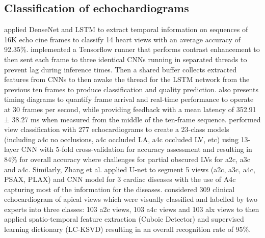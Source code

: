 \documentclass[mlabstract,twocolumn]{jmlr}
\begin{document}
\subsection{Classification of echochardiograms}
\citet{woudenberg2018} applied DenseNet and LSTM to extract temporal information on sequences of 16K echo cine frames to classify 14 heart views with an average accuracy of 92.35\%.
\citet{woudenberg2018} implemented a Tensorflow runner that performs contrast enhancement to then sent each frame to three identical CNNs running in separated threads to prevent lag during inference times.
Then a shared buffer collects extracted features from CNNs to then awake the thread for the LSTM network from the previous ten frames to produce classification and quality prediction.
\citet{woudenberg2018} also presents timing diagrams to quantify frame arrival and real-time performance to operate at 30 frames per second, while providing feedback with a mean latency of 352.91 ± 38.27 ms when measured from the middle of the ten-frame sequence.
\citet{zhang2018} performed view classification with 277 echocardiograms to create a 23-class models (including a4c no occlusions, a4c occluded LA, a4c occluded LV, etc) using 13-layer CNN with 5-fold cross-validation for accuracy assessment and resulting in 84\% for overall accuracy where challenges for partial obscured LVs for a2c, a3c and a4c.
Similarly, Zhang et al. applied U-net to segment 5 views (a2c, a3c, a4c, PSAX, PLAX) and CNN model for 3 cardiac diseases with the use of A4c capturing most of the information for the diseases.
\citet{khamis2017} considered 309 clinical echocardiogram of apical views which were visually classified and labelled by two experts into three classes: 103 a2c views, 103 a4c views and 103 alx views to then applied spatio-temporal feature extraction (Cuboic Detector) and supervised learning dictionary (LC-KSVD) resulting in an overall recognition rate of 95\%.
\end{document}

